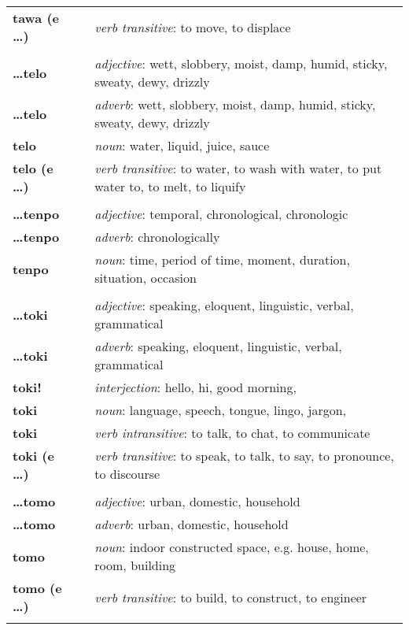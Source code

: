 \begin{supertabular}{p{2,5cm}|ll}
\textbf{tawa (e \dots)} && \textit{verb transitive}: to move, to displace \\ 
 && \\ %
\textbf{\dots telo} && \textit{adjective}: wett, slobbery, moist, damp, humid, sticky, sweaty, dewy, drizzly \\ 
\textbf{\dots telo} && \textit{adverb}: wett, slobbery, moist, damp, humid, sticky, sweaty, dewy, drizzly \\ 
\textbf{telo} && \textit{noun}: water, liquid, juice, sauce \\ 
\textbf{telo (e \dots)} && \textit{verb transitive}: to water, to wash with water, to put water to, to melt, to liquify \\ 
 && \\ %
\textbf{\dots tenpo} && \textit{adjective}: temporal, chronological, chronologic \\ 
\textbf{\dots tenpo} && \textit{adverb}: chronologically \\ 
\textbf{tenpo} && \textit{noun}: time, period of time, moment, duration, situation, occasion \\ 
 && \\ %
\textbf{\dots toki} && \textit{adjective}: speaking, eloquent, linguistic, verbal, grammatical \\ 
\textbf{\dots toki} && \textit{adverb}: speaking, eloquent, linguistic, verbal, grammatical \\ 
\textbf{toki!} && \textit{interjection}: hello, hi, good morning, \\ 
\textbf{toki} && \textit{noun}: language, speech, tongue, lingo, jargon, \\ 
\textbf{toki} && \textit{verb intransitive}: to talk, to chat, to communicate \\ 
\textbf{toki (e \dots)} && \textit{verb transitive}: to speak, to talk, to say, to pronounce, to discourse \\ 
 && \\ %
\textbf{\dots tomo} && \textit{adjective}: urban, domestic, household \\ 
\textbf{\dots tomo} && \textit{adverb}: urban, domestic, household \\ 
\textbf{tomo} && \textit{noun}: indoor constructed space, e.g. house, home, room, building \\ 
\textbf{tomo (e \dots)} && \textit{verb transitive}: to build, to construct, to engineer \\ 
 && \\ %

\end{supertabular}
